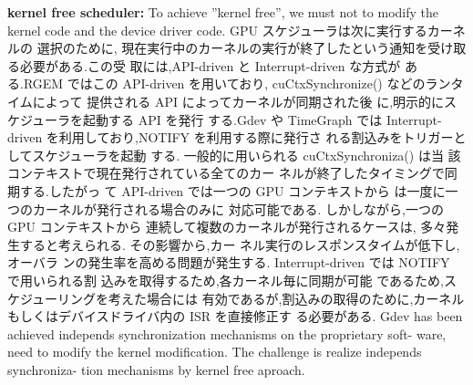 \textbf{kernel free scheduler:}
To achieve ”kernel free”,
we must not to modify the kernel code and the device driver code.
GPU スケジューラは次に実行するカーネルの 選択のために,
現在実行中のカーネルの実行が終了したという通知を受け取る必要がある.この受 取には,API-driven と Interrupt-driven な方式が ある.RGEM ではこの API-driven を用いており, cuCtxSynchronize() などのランタイムによって 提供される API によってカーネルが同期された後 に,明示的にスケジューラを起動する API を発行 する.Gdev や TimeGraph では Interrupt-driven を利用しており,NOTIFY を利用する際に発行さ れる割込みをトリガーとしてスケジューラを起動 する.
一般的に用いられる cuCtxSynchroniza() は当 該コンテキストで現在発行されている全てのカー ネルが終了したタイミングで同期する.したがっ て API-driven では一つの GPU コンテキストから は一度に一つのカーネルが発行される場合のみに 対応可能である.
しかしながら,一つの GPU コンテキストから 連続して複数のカーネルが発行されるケースは, 多々発生すると考えられる. その影響から,カー ネル実行のレスポンスタイムが低下し,オーバラ ンの発生率を高める問題が発生する.
Interrupt-driven では NOTIFY で用いられる割 込みを取得するため,各カーネル毎に同期が可能 であるため,スケジューリングを考えた場合には 有効であるが,割込みの取得のために,カーネル もしくはデバイスドライバ内の ISR を直接修正す る必要がある.
Gdev has been achieved independs synchronization mechanisms on the proprietary soft- ware, need to modify the kernel modification. The challenge is realize independs synchroniza- tion mechanisms by kernel free aproach.
